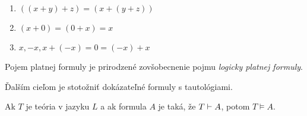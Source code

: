 \begin{priklad}
    \begin{enumerate}
            \item $((x+y)+z) = (x+(y+z))$
            \item $(x+0) = (0+x) = x$
            \item $x, -x, x+(-x) = 0 = (-x)+x$
    \end{enumerate}
\end{priklad}


\par
Pojem platnej formuly je prirodzené zovšobecnenie pojmu \emph{logicky platnej
formuly}.

Ďalším cieľom je stotožniť dokázateľné formuly s tautológiami.

\begin{veta}[o korektnosti]
    Ak $T$ je teória v jazyku $L$ a ak formula $A$ je taká,
    že $T \vdash A$, potom $T \models A$.
\end{veta}

